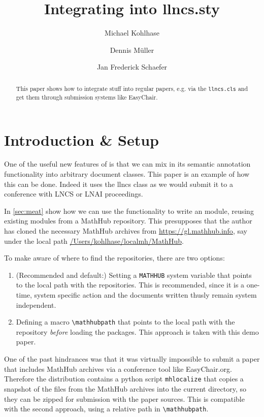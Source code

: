 \documentclass{llncs}
\title{Integrating \protect\sTeX into llncs.sty}
\author{Michael Kohlhase\orcidID{0000-0002-9859-6337} \and Dennis M\"uller\orcidID{0000-0002-4482-4912} \and Jan Frederick Schaefer}
\institute{Computer Science, FAU  Erlangen-N\"urnberg}
\begin{document}
\maketitle
\begin{abstract}
  This paper shows how to integrate \sTeX stuff into regular papers, e.g. via the
  \texttt{llncs.cls} and get them through submission systems like EasyChair.
\end{abstract}

\section{Introduction \& Setup}\label{sec:intro}

One of the useful new features of \sTeX is that we can mix in its semantic annotation
functionality into arbitrary document classes. This paper is an example of how this can be
done. Indeed it uses the \textsf{llncs} class as we would submit it to a conference with
LNCS or LNAI proceedings.

In \cref{sec:meat} show how we can use the \sTeX functionality to write an \sTeX module, reusing existing modules from a MathHub repository. This presupposes that the author has cloned the necessary MathHub archives from
\url{https://gl.mathhub.info}, say under the local path
\url{/Users/kohlhase/localmh/MathHub}.

To make \sTeX aware of where to find the repositories, there are two options:
\begin{enumerate}
	\item (Recommended and default:) Setting a \texttt{MATHHUB} system variable
		that points to the local path with the repositories. This
		is recommended, since it is a one-time, system specific action
		and the documents written thusly remain system independent.
	\item Defining a macro \texttt{\textbackslash mathhubpath} that
		points to the local path with the repository \emph{before}
		loading the \sTeX packages. This approach is taken with this
		demo paper.
\end{enumerate}


One of the past hindrances was that it was
virtually impossible to submit a paper that includes MathHub archives via a conference
tool like EasyChair.org. Therefore the \sTeX distribution contains a python script
\texttt{mhlocalize} that copies a snapshot of the \sTeX files from the MathHub archives
into the current directory, so they can be zipped for submission with the paper sources. This is compatible with the second approach, using a relative path in \texttt{\textbackslash mathhubpath}.
\end{document}
